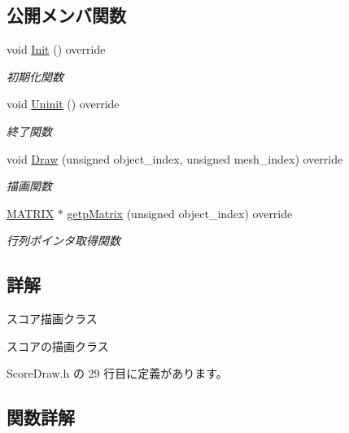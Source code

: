 \subsection*{公開メンバ関数}
\begin{DoxyCompactItemize}
\item 
void \mbox{\hyperlink{class_score_draw_af013abb96136825e71d4fee06529fc69}{Init}} () override
\begin{DoxyCompactList}\small\item\em 初期化関数 \end{DoxyCompactList}\item 
void \mbox{\hyperlink{class_score_draw_aad744f8a7a1202e6ba8117c660f297ee}{Uninit}} () override
\begin{DoxyCompactList}\small\item\em 終了関数 \end{DoxyCompactList}\item 
void \mbox{\hyperlink{class_score_draw_a799e71943140a264cedba6002308b976}{Draw}} (unsigned object\+\_\+index, unsigned mesh\+\_\+index) override
\begin{DoxyCompactList}\small\item\em 描画関数 \end{DoxyCompactList}\item 
\mbox{\hyperlink{_vector3_d_8h_a032295cd9fb1b711757c90667278e744}{M\+A\+T\+R\+IX}} $\ast$ \mbox{\hyperlink{class_score_draw_adb995c83624c2eab8b8a15d1182df5b8}{getp\+Matrix}} (unsigned object\+\_\+index) override
\begin{DoxyCompactList}\small\item\em 行列ポインタ取得関数 \end{DoxyCompactList}\end{DoxyCompactItemize}


\subsection{詳解}
スコア描画クラス 

スコアの描画クラス 

 Score\+Draw.\+h の 29 行目に定義があります。



\subsection{関数詳解}
\mbox{\label{class_score_draw_a799e71943140a264cedba6002308b976}} 
